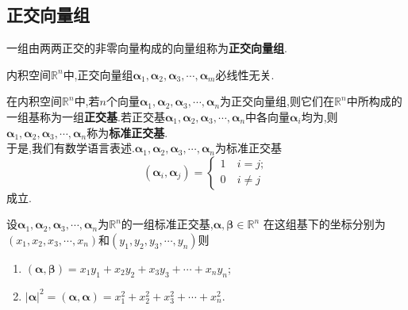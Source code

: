 \documentclass[9pt,a4paper]{book}
\begin{document}
\subsection{正交向量组}
\begin{defination}
	一组由两两正交的非零向量构成的向量组称为\textbf{正交向量组}.
\end{defination}
\begin{theorem}
	内积空间$ \mathbb{R}^n $中,正交向量组$ \bm{\alpha}_{1},\bm{\alpha}_{2},\bm{\alpha}_{3},\cdots,\bm{\alpha}_{m} $必线性无关.
\end{theorem}
\begin{defination}[正交基与标准正交基定义]
	在内积空间$ \mathbb{R}^n $中,若$ n $个向量$ \bm{\alpha}_{1},\bm{\alpha}_{2},\bm{\alpha}_{3},\cdots,\bm{\alpha}_{n} $为正交向量组,则它们在$ \mathbb{R}^n $中所构成的一组基称为一组\textbf{正交基}.若正交基$\bm{\alpha}_{1},\bm{\alpha}_{2},\bm{\alpha}_{3},\cdots,\bm{\alpha}_{n} $中各向量$ \bm{\alpha}_i $均为,则$\bm{\alpha}_{1},\bm{\alpha}_{2},\bm{\alpha}_{3},\cdots,\bm{\alpha}_{n} $称为\textbf{标准正交基}.\\
	于是,我们有数学语言表述.$\bm{\alpha}_{1},\bm{\alpha}_{2},\bm{\alpha}_{3},\cdots,\bm{\alpha}_{n} $为标准正交基
	\[
	(\bm{\alpha}_i,\bm{\alpha}_j)= \begin{cases}
	1&\ i=j;\\
	0&\ i\neq j
	\end{cases}
	\]成立.
\end{defination}
\begin{feature}
	设$\bm{\alpha}_{1},\bm{\alpha}_{2},\bm{\alpha}_{3},\cdots,\bm{\alpha}_{n} $为$ \mathbb{R}^n $的一组标准正交基,$ \bm{\alpha},\bm{\beta}\in\mathbb{R}^n $ 在这组基下的坐标分别为$ (x_1,x_2,x_3,\cdots,x_n) $和$ (y_1,y_2,y_3,\cdots,y_n) $则
	\begin{enumerate}
		\item $(\bm{\alpha},\bm{\beta})=x_1y_1+x_2y_2+x_3y_3+\cdots+x_ny_n$;
		\item $ |\bm{\alpha}|^2=(\bm{\alpha},\bm{\alpha})=x_1^2+x_2^2+x_3^2+\cdots+x_n^2 $.
	\end{enumerate}
\end{feature}
\end{document}
